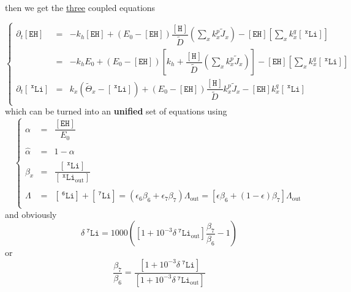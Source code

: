 \documentclass[aps,onecolumn,12pt]{revtex4}
\newcommand{\mychem}[1]{\mathtt{#1}}
\newcommand{\myconc}[1]{\left\lbrack{#1}\right\rbrack}
\newcommand{\spLi}[1]{{~^{\mychem{#1}}\mychem{Li}}}
\newcommand{\Li}[1]{\myconc{\spLi{#1}}}
\newcommand{\spLiOut}[1]{{\spLi{#1}}_{\mathrm{out}}}
\newcommand{\LiOut}[1]{\myconc{\spLiOut{#1}}}
\newcommand{\spEHin}{\mychem{EH}}
\newcommand{\EHin}{\myconc{\spEHin}}
\newcommand{\spproton}{\mychem{H}}
\newcommand{\proton}{\myconc{\spproton}}
\newcommand{\deltaLi}{ {\delta\!\!\!\spLi{7}} }
\newcommand{\deltaLiOut}{{\deltaLi}_{\mathrm{out}}}
\newcommand{\LiAll}{\Lambda}
\newcommand{\LiAllOut}{{\LiAll}_{\mathrm{out}}}
\begin{document}
then we get the \underline{three} coupled equations  

\begin{equation}
\left\lbrace
	\begin{array}{rcl}
		\partial_t\EHin & = & -k_h \EHin + \left(E_0- \EHin\right) \dfrac{\proton}{\tilde{D}} \left(\sum_x k_x^p \tilde{J}_x \right)  
		- \EHin \left\lbrack {\sum_x k_x^q \Li{x}} \right\rbrack\\
		& = & 
		-k_h E_0+ \left(E_0- \EHin\right)\left\lbrack k_h+ \dfrac{\proton}{\tilde{D}} \left(\sum_x k_x^p \tilde{J}_x \right)\right] 
		- \EHin \left\lbrack {\sum_x k_x^q \Li{x}} \right\rbrack\\
		\partial_t\Li{x} & = & k_x \left(\tilde{\Theta}_x -\Li{x} \right)  + \left(E_0-\EHin\right) \dfrac{\proton}{\tilde{D}}   k_x^p \tilde{J}_x  - \EHin k_x^q \Li{x}\\
	\end{array}
\right.
\end{equation}
which can be turned into an \textbf{unified} set of equations using
\begin{equation}
\left\lbrace
\begin{array}{rcl}
	\alpha & = & \dfrac{\EHin}{E_0}\\
	\\
	\hat\alpha & = & 1-\alpha\\
	\\
	\beta_x & = & \dfrac{\Li{x}}{\LiOut{x}}\\
	\\
	\Lambda & = & \Li{6} + \Li{7} = \left(\epsilon_6 \beta_6 + \epsilon_7 \beta_7\right) \LiAllOut = \left[\epsilon \beta_6 + (1-\epsilon) \beta_7\right] \LiAllOut\\
\end{array}
\right.
\end{equation}
and obviously
\begin{equation}
	\deltaLi = 1000 \left ( \left[1+10^{-3}\deltaLiOut\right] \dfrac{\beta_7}{\beta_6}-1\right)
\end{equation}
or
\begin{equation}
	\dfrac{\beta_7}{\beta_6} = \dfrac{\left[1+10^{-3}\deltaLi\right]}{\left[1+10^{-3}\deltaLiOut\right]}
\end{equation}
\end{document}
